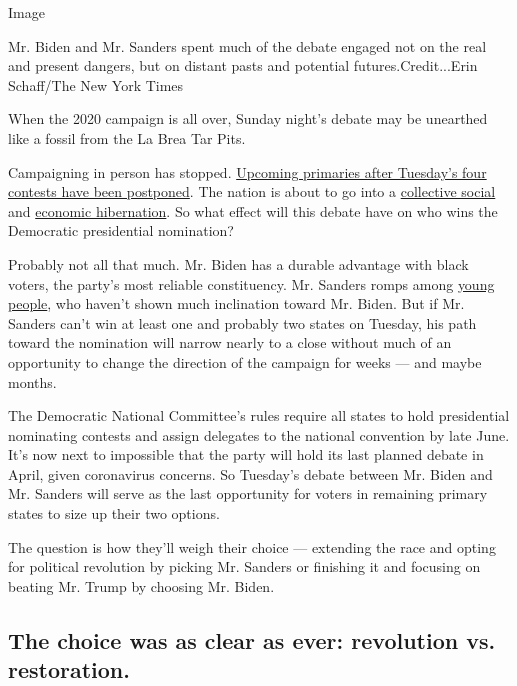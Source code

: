 Image

Mr. Biden and Mr. Sanders spent much of the debate engaged not on the
real and present dangers, but on distant pasts and potential
futures.Credit...Erin Schaff/The New York Times

When the 2020 campaign is all over, Sunday night's debate may be
unearthed like a fossil from the La Brea Tar Pits.

Campaigning in person has stopped.
\href{https://www.nytimes.com/article/2020-campaign-primary-calendar-coronavirus.html}{Upcoming
primaries after Tuesday's four contests have been postponed}. The nation
is about to go into a
\href{https://www.nytimes.com/2020/03/15/nyregion/new-york-coronavirus.html}{collective
social} and
\href{https://www.nytimes.com/2020/03/15/business/economy/federal-reserve-coronavirus.html}{economic
hibernation}. So what effect will this debate have on who wins the
Democratic presidential nomination?

Probably not all that much. Mr. Biden has a durable advantage with black
voters, the party's most reliable constituency. Mr. Sanders romps among
\href{https://www.nytimes.com/2020/03/13/us/politics/joe-biden-young-voters-bernie-sanders.html}{young
people}, who haven't shown much inclination toward Mr. Biden. But if Mr.
Sanders can't win at least one and probably two states on Tuesday, his
path toward the nomination will narrow nearly to a close without much of
an opportunity to change the direction of the campaign for weeks --- and
maybe months.

The Democratic National Committee's rules require all states to hold
presidential nominating contests and assign delegates to the national
convention by late June. It's now next to impossible that the party will
hold its last planned debate in April, given coronavirus concerns. So
Tuesday's debate between Mr. Biden and Mr. Sanders will serve as the
last opportunity for voters in remaining primary states to size up their
two options.

The question is how they'll weigh their choice --- extending the race
and opting for political revolution by picking Mr. Sanders or finishing
it and focusing on beating Mr. Trump by choosing Mr. Biden.

\hypertarget{the-choice-was-as-clear-as-ever-revolution-vs-restoration}{%
\subsection{The choice was as clear as ever: revolution vs.
restoration.}\label{the-choice-was-as-clear-as-ever-revolution-vs-restoration}}

